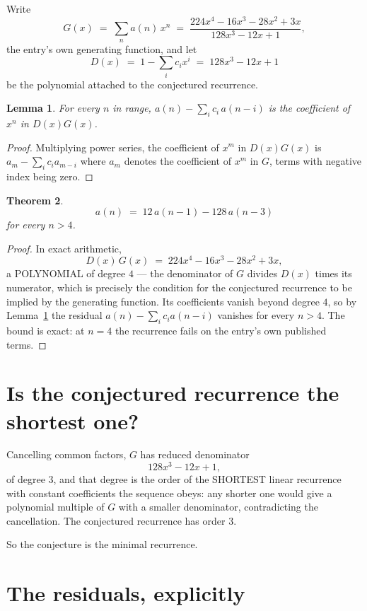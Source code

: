 \documentclass[11pt,a4paper]{article}
\theoremstyle{plain}
\newtheorem{theorem}{Theorem}
\newtheorem{lemma}[theorem]{Lemma}
\theoremstyle{definition}
\begin{document}
Write
\[
G(x)\;=\;\sum_{n}a(n)\,x^{n}\;=\;\frac{224 x^{4} - 16 x^{3} - 28 x^{2} + 3 x}{128 x^{3} - 12 x + 1},
\]
the entry's own generating function, and let
\[
D(x)\;=\;1-\sum_i c_i x^{i}\;=\;128 x^{3} - 12 x + 1
\]
be the polynomial attached to the conjectured recurrence.

\begin{lemma}\label{lem:key}
For every $n$ in range, $a(n)-\sum_i c_i\,a(n-i)$ is the coefficient of $x^{n}$ in
$D(x)G(x)$.
\end{lemma}

\begin{proof}
Multiplying power series, the coefficient of $x^{m}$ in $D(x)G(x)$ is
$a_m-\sum_i c_i a_{m-i}$ where $a_m$ denotes the coefficient of $x^{m}$ in $G$, terms with
negative index being zero.
\end{proof}

\begin{theorem}
\[
a(n)\;=\;12\,a(n-1) - 128\,a(n-3)
\]
for every $n>4$.
\end{theorem}

\begin{proof}
In exact arithmetic,
\[
D(x)\,G(x)\;=\;224 x^{4} - 16 x^{3} - 28 x^{2} + 3 x,
\]
a POLYNOMIAL of degree $4$ --- the denominator of $G$ divides $D(x)$ times its numerator,
which is precisely the condition for the conjectured recurrence to be implied by the
generating function. Its coefficients vanish beyond degree $4$, so by
Lemma~\ref{lem:key} the residual $a(n)-\sum_ic_ia(n-i)$ vanishes for every
$n>4$. The bound is exact: at $n=4$ the recurrence fails on the entry's own published terms.
\end{proof}

\section{Is the conjectured recurrence the shortest one?}

Cancelling common factors, $G$ has reduced denominator
\[
128 x^{3} - 12 x + 1,
\]
of degree $3$, and that degree is the order of the SHORTEST linear recurrence with
constant coefficients the sequence obeys: any shorter one would give a polynomial multiple of
$G$ with a smaller denominator, contradicting the cancellation. The conjectured recurrence has
order $3$.

So the conjecture is the minimal recurrence.

\section{The residuals, explicitly}
\end{document}
